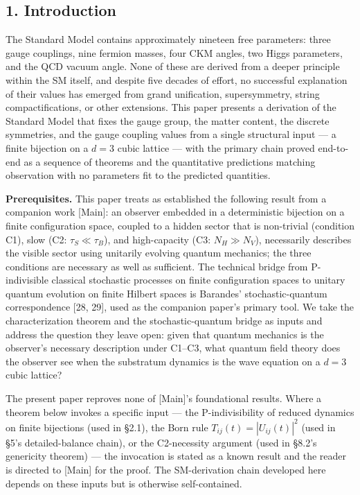 \documentclass[
]{article}
\begin{document}
\hypertarget{introduction}{%
\subsection{1. Introduction}\label{introduction}}

The Standard Model contains approximately nineteen free parameters:
three gauge couplings, nine fermion masses, four CKM angles, two Higgs
parameters, and the QCD vacuum angle. None of these are derived from a
deeper principle within the SM itself, and despite five decades of
effort, no successful explanation of their values has emerged from grand
unification, supersymmetry, string compactifications, or other
extensions. This paper presents a derivation of the Standard Model that
fixes the gauge group, the matter content, the discrete symmetries, and
the gauge coupling values from a single structural input --- a finite
bijection on a \(d = 3\) cubic lattice --- with the primary chain proved
end-to-end as a sequence of theorems and the quantitative predictions
matching observation with no parameters fit to the predicted quantities.

\textbf{Prerequisites.} This paper treats as established the following
result from a companion work {[}Main{]}: an observer embedded in a
deterministic bijection on a finite configuration space, coupled to a
hidden sector that is non-trivial (condition C1), slow (C2:
\(\tau_S \ll \tau_B\)), and high-capacity (C3: \(N_H \gg N_V\)),
necessarily describes the visible sector using unitarily evolving
quantum mechanics; the three conditions are necessary as well as
sufficient. The technical bridge from P-indivisible classical stochastic
processes on finite configuration spaces to unitary quantum evolution on
finite Hilbert spaces is Barandes' stochastic-quantum correspondence
{[}28, 29{]}, used as the companion paper's primary tool. We take the
characterization theorem and the stochastic-quantum bridge as inputs and
address the question they leave open: given that quantum mechanics is
the observer's necessary description under C1--C3, what quantum field
theory does the observer see when the substratum dynamics is the wave
equation on a \(d = 3\) cubic lattice?

The present paper reproves none of {[}Main{]}'s foundational results.
Where a theorem below invokes a specific input --- the P-indivisibility
of reduced dynamics on finite bijections (used in §2.1), the Born rule
\(T_{ij}(t) = |U_{ij}(t)|^2\) (used in §5's detailed-balance chain), or
the C2-necessity argument (used in §8.2's genericity theorem) --- the
invocation is stated as a known result and the reader is directed to
{[}Main{]} for the proof. The SM-derivation chain developed here depends
on these inputs but is otherwise self-contained.
\end{document}
